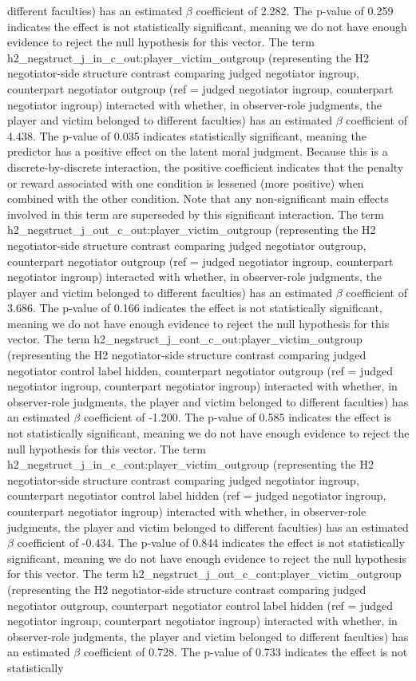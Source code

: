 \documentclass[11pt]{article}
\begin{document}
different faculties) has an estimated $\beta$ coefficient of 2.282. The p-value of 0.259 indicates the effect is not statistically significant, meaning we do not have enough evidence to reject the null hypothesis for this vector. The term h2\_negstruct\_j\_in\_c\_out:player\_victim\_outgroup (representing the H2 negotiator-side structure contrast comparing judged negotiator ingroup, counterpart negotiator outgroup (ref = judged negotiator ingroup, counterpart negotiator ingroup) interacted with whether, in observer-role judgments, the player and victim belonged to different faculties) has an estimated $\beta$ coefficient of 4.438. The p-value of 0.035 indicates statistically significant, meaning the predictor has a positive effect on the latent moral judgment. Because this is a discrete-by-discrete interaction, the positive coefficient indicates that the penalty or reward associated with one condition is lessened (more positive) when combined with the other condition. Note that any non-significant main effects involved in this term are superseded by this significant interaction. The term h2\_negstruct\_j\_out\_c\_out:player\_victim\_outgroup (representing the H2 negotiator-side structure contrast comparing judged negotiator outgroup, counterpart negotiator outgroup (ref = judged negotiator ingroup, counterpart negotiator ingroup) interacted with whether, in observer-role judgments, the player and victim belonged to different faculties) has an estimated $\beta$ coefficient of 3.686. The p-value of 0.166 indicates the effect is not statistically significant, meaning we do not have enough evidence to reject the null hypothesis for this vector. The term h2\_negstruct\_j\_cont\_c\_out:player\_victim\_outgroup (representing the H2 negotiator-side structure contrast comparing judged negotiator control label hidden, counterpart negotiator outgroup (ref = judged negotiator ingroup, counterpart negotiator ingroup) interacted with whether, in observer-role judgments, the player and victim belonged to different faculties) has an estimated $\beta$ coefficient of -1.200. The p-value of 0.585 indicates the effect is not statistically significant, meaning we do not have enough evidence to reject the null hypothesis for this vector. The term h2\_negstruct\_j\_in\_c\_cont:player\_victim\_outgroup (representing the H2 negotiator-side structure contrast comparing judged negotiator ingroup, counterpart negotiator control label hidden (ref = judged negotiator ingroup, counterpart negotiator ingroup) interacted with whether, in observer-role judgments, the player and victim belonged to different faculties) has an estimated $\beta$ coefficient of -0.434. The p-value of 0.844 indicates the effect is not statistically significant, meaning we do not have enough evidence to reject the null hypothesis for this vector. The term h2\_negstruct\_j\_out\_c\_cont:player\_victim\_outgroup (representing the H2 negotiator-side structure contrast comparing judged negotiator outgroup, counterpart negotiator control label hidden (ref = judged negotiator ingroup, counterpart negotiator ingroup) interacted with whether, in observer-role judgments, the player and victim belonged to different faculties) has an estimated $\beta$ coefficient of 0.728. The p-value of 0.733 indicates the effect is not statistically 
\end{document}
